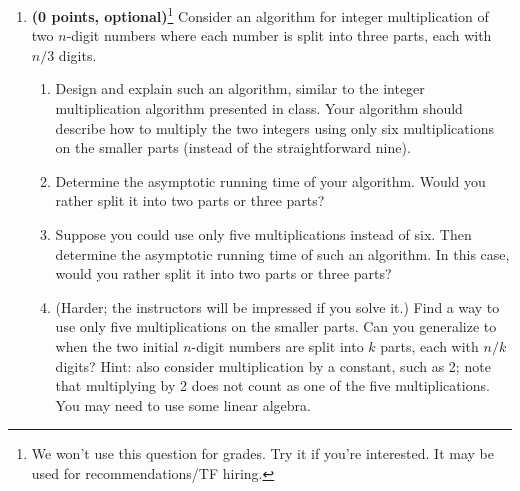 \documentclass[10pt]{article}
\begin{document}
\begin{enumerate}
\item 
{\bf (0 points, optional)}\footnote{We won't use this question for grades. Try it if you're interested. 
It may be used for recommendations/TF hiring.}
Consider an algorithm for integer multiplication of two $n$-digit
numbers where each number is split into three parts, each with
$n/3$ digits. 
\begin{enumerate}
\item Design and explain such an algorithm, similar to the integer
multiplication algorithm presented in class.  Your algorithm should
describe how to multiply the two integers using only six
multiplications on the smaller parts (instead of the straightforward
nine).
\item Determine the asymptotic running time of your algorithm.  
Would you rather split it into two parts or three parts?
\item Suppose you could use only five multiplications instead of six.
Then determine the asymptotic running time of such an algorithm.  
In this case, would you rather split it into two parts or three parts?
\item (Harder; the instructors will be impressed if you solve it.)
Find a way to use only five multiplications on the smaller parts.
Can you generalize to when the two initial $n$-digit numbers are 
split into $k$ parts, each with $n/k$ digits?
Hint:  also consider multiplication by a constant, such as 2;  note
that multiplying by 2 does not count as one of the five multiplications.
You may need to use some linear algebra.
\end{enumerate}


\end{enumerate}
\end{document}
